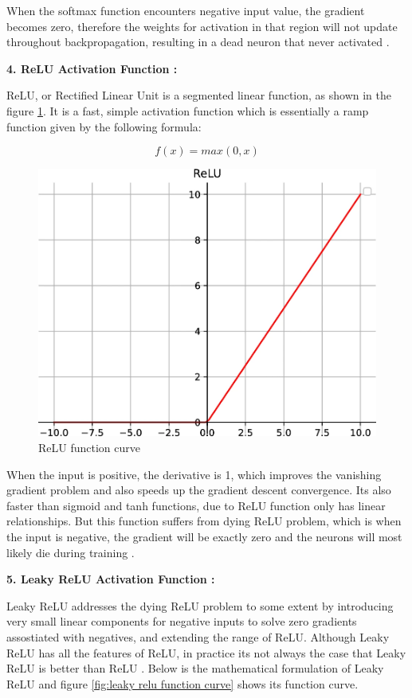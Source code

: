 When the softmax function encounters negative input value, the gradient becomes zero, therefore the weights for activation in that region will not update throughout backpropagation, resulting in a dead neuron that never activated \cite{Zhao2024}.

\textbf{4. ReLU Activation Function :}

ReLU, or Rectified Linear Unit is a segmented linear function, as shown in the figure \ref{fig:relu function curve}. It is a fast, simple activation function which is essentially a ramp function given by the following formula:

\[
    f(x) = max(0,x)
\]


\begin{figure}[H]
    \centering
    \includegraphics[width=1\linewidth]{Rohit_Master_Thesis//Images/relu_af.png}
    \caption{ReLU function curve \cite{Zhao2024}}
    \label{fig:relu function curve}
\end{figure}

When the input is positive, the derivative is 1, which improves the vanishing gradient problem and also speeds up the gradient descent convergence. Its also faster than sigmoid and tanh functions, due to ReLU function only has linear relationships. But this function suffers from dying ReLU problem, which is when the input is negative, the gradient will be exactly zero and the neurons will most likely die during training \cite{Zhao2024}.

\textbf{5. Leaky ReLU Activation Function :}

Leaky ReLU addresses the dying ReLU problem to some extent by introducing very small linear components for negative inputs to solve zero gradients assostiated with negatives, and extending the range of ReLU. Although Leaky ReLU has all the features of ReLU, in practice its not always the case that Leaky ReLU is better than ReLU \cite{Zhao2024}. Below is the mathematical formulation of Leaky ReLU and figure \ref{fig:leaky relu function curve} shows its function curve.

